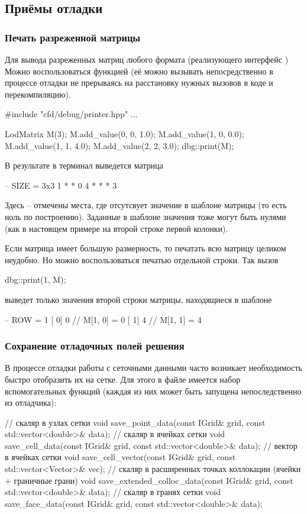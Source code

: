 \subsection{Приёмы отладки}
\subsubsection{Печать разреженной матрицы}
Для вывода разреженных матриц любого формата
(реализующего интерфейс )
Можно воспользоваться функцией 
(её можно вызывать непосредственно в процессе отладки
не прерываясь на расстановку нужных вызовов в коде и перекомпиляцию).
\begin{cppcode}
#include "cfd/debug/printer.hpp"
...

LodMatrix M(3);
M.add_value(0, 0, 1.0); 
M.add_value(1, 0, 0.0); 
M.add_value(1, 1, 4.0); 
M.add_value(2, 2, 3.0); 
dbg::print(M);
\end{cppcode}
В результате в терминал выведется матрица
\begin{shelloutput}
-- SIZE = 3x3
     1      *      *
     0      4      *
     *      *      3
\end{shelloutput}
Здесь \cvar{*} -- отмечены места, где отсутсвует значение в шаблоне матрицы (то есть ноль по построению).
Заданные в шаблоне значения тоже могут быть нулями (как в настоящем примере на второй строке первой колонки).

Если матрица имеет большую размерность, то печатать всю матрицу целиком неудобно.
Но можно воспользоваться печатью отдельной строки.
Так вызов
\begin{cppcode}
dbg::print(1, M);
\end{cppcode}
выведет только значения второй строки матрицы, находящиеся в шаблоне
\begin{shelloutput}
-- ROW = 1
   [   0] 0   // M[1, 0] = 0
   [   1] 4   // M[1, 1] = 4
\end{shelloutput}

\subsubsection{Сохранение отладочных полей решения}
В процессе отладки работы с сеточными данными
часто возникает необходимость быстро отобразить
их на сетке. Для этого в файле 
имеется набор вспомогательных функций (каждая из них может быть запущена непоследственно из отладчика):

\begin{cppcode}
// скаляр в узлах сетки
void save_point_data(const IGrid& grid, const std::vector<double>& data);
// скаляр в ячейках сетки
void save_cell_data(const IGrid& grid, const std::vector<double>& data);
// вектор в ячейках сетки
void save_cell_vector(const IGrid& grid, const std::vector<Vector>& vec);
// скаляр в расширенных точках коллокации (ячейки + граничные грани)
void save_extended_colloc_data(const IGrid& grid, const std::vector<double>& data);
// скаляр в гранях сетки
void save_face_data(const IGrid& grid, const std::vector<double>& data);
\end{cppcode}

